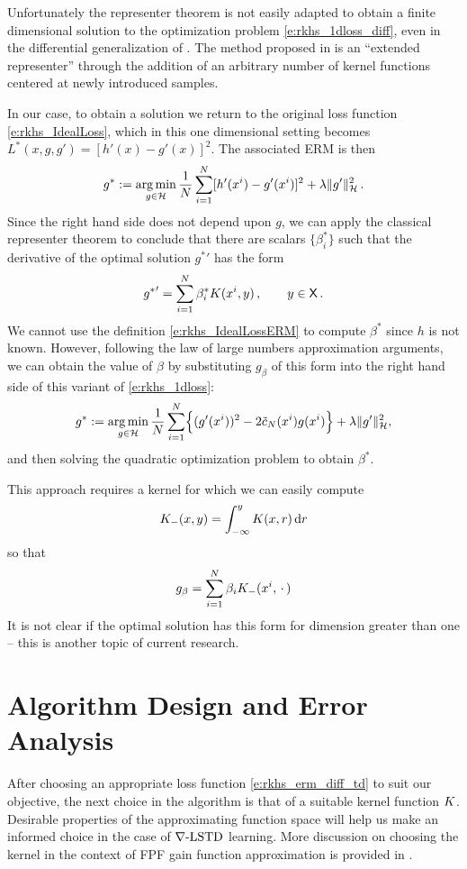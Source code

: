 Unfortunately the representer theorem is not easily adapted to obtain a finite dimensional solution to  the optimization problem \eqref{e:rkhs_1dloss_diff},  even in the differential generalization of  \cite{zho08}. The method proposed in \cite{bhujlaugil} is an ``extended representer'' through the addition of an arbitrary number of kernel functions centered at newly introduced samples.

In our case, to obtain a solution we return to the original loss function \eqref{e:rkhs_IdealLoss}, which in this one dimensional setting becomes $L^*(x,g,g') = [h'(x) - g'(x)]^2$.    The associated ERM is then
\begin{equation}
g^* := \argmin_{g\in\clH} \frac{1}{N} \sum_{i=1}^N [h'(x^i) - g'(x^i)]^2 + \lambda \|g'\|^2_\clH \, .
\label{e:rkhs_IdealLossERM}
\end{equation}
Since the right hand side does not depend upon $g$, we can apply the classical representer theorem to conclude that there are scalars $\{\beta^*_i\}$ such that the derivative of the optimal solution ${g^*}'$ has the form  
\[
{g^*}'  = \sum_{i=1}^N  \beta_i^* K(x^i,y) \,,  \qquad y \in {\sf X} \, .
\]
We cannot use the definition \eqref{e:rkhs_IdealLossERM} to compute $\beta^*$ since $h$ is not known.   However,  following the law of large numbers approximation arguments, we can obtain the value of $\beta$  by substituting $g_\beta$ of this form into the right hand side  of this variant of \eqref{e:rkhs_1dloss}: 
\begin{equation*}
g^* := \argmin_{g\in\clH} \frac{1}{N} \sum_{i=1}^N \Bigl\{ (g'(x^i))^2 - 2 \tilc_N(x^i) g(x^i) \Bigr\} + \lambda \|g'\|^2_\clH,
\label{e:rkhs_1dlossDiff}
\end{equation*}
and then solving the quadratic optimization problem to obtain $\beta^*$.

This approach requires a kernel   for which we can easily compute
\[
K_-(x,y) = \int_{-\infty}^y  K(x,r)\,  \text{d} r
\]
so that
\[
g_\beta =  \sum_{i=1}^N \beta_i  K_-(x^i,\,\cdot\,)
\]
It is not clear if the optimal solution has this form for dimension greater than one -- this is another topic of current research.


\section{Algorithm Design and Error Analysis}
\label{s:error_analysis}
After choosing an appropriate loss function \eqref{e:rkhs_erm_diff_td} to suit our objective, the next choice in the algorithm is that of a suitable kernel function $K$. Desirable properties of the approximating function space will help us make an informed choice in the case of $\nabla\text{-LSTD}$ learning. More discussion on choosing the kernel in the context of FPF gain function approximation is provided in . 

